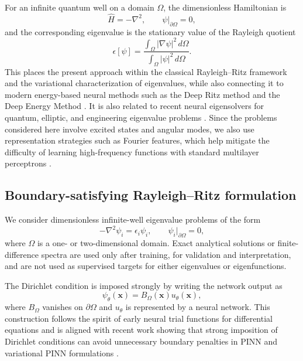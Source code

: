 \documentclass[10pt,onecolumn]{article}
\begin{document}
For an infinite quantum well on a domain $\Omega$, the dimensionless Hamiltonian is
\begin{equation}
\hat{H}=-\nabla^2,
\qquad
\psi|_{\partial\Omega}=0,
\end{equation}
and the corresponding eigenvalue is the stationary value of the Rayleigh quotient
\begin{equation}
\epsilon[\psi]=
\frac{\int_\Omega |\nabla\psi|^2\,d\Omega}
{\int_\Omega |\psi|^2\,d\Omega}.
\label{eq:rayleigh}
\end{equation}
This places the present approach within the classical Rayleigh--Ritz framework and the variational characterization of eigenvalues, while also connecting it to modern energy-based neural methods such as the Deep Ritz method and the Deep Energy Method \cite{Courant1953,Kato1995,Parlett1998,Bai2000,Knyazev2001,E2018,Samaniego2020,Nguyen2025}. It is also related to recent neural eigensolvers for quantum, elliptic, and engineering eigenvalue problems \cite{Jin2022,Holliday2023,Harcombe2023,Bonder2025,Rowan2025}. Since the problems considered here involve excited states and angular modes, we also use representation strategies such as Fourier features, which help mitigate the difficulty of learning high-frequency functions with standard multilayer perceptrons \cite{Tancik2020,Wang2021}.

\subsection{Boundary-satisfying Rayleigh--Ritz formulation}

We consider dimensionless infinite-well eigenvalue problems of the form
\begin{equation}
-\nabla^2\psi_i=\epsilon_i\psi_i,\qquad \psi_i|_{\partial\Omega}=0,
\label{eq:schrodinger}
\end{equation}
where $\Omega$ is a one- or two-dimensional domain. Exact analytical solutions or finite-difference spectra are used only after training, for validation and interpretation, and are not used as supervised targets for either eigenvalues or eigenfunctions.

The Dirichlet condition is imposed strongly by writing the network output as
\begin{equation}
\psi_\theta(\mathbf{x})=B_\Omega(\mathbf{x})u_\theta(\mathbf{x}),
\label{eq:ansatz}
\end{equation}
where $B_\Omega$ vanishes on $\partial\Omega$ and $u_\theta$ is represented by a neural network. This construction follows the spirit of early neural trial functions for differential equations \cite{Lagaris1998} and is aligned with recent work showing that strong imposition of Dirichlet conditions can avoid unnecessary boundary penalties in PINN and variational PINN formulations \cite{Sukumar2022,Berrone2022}.
\end{document}
